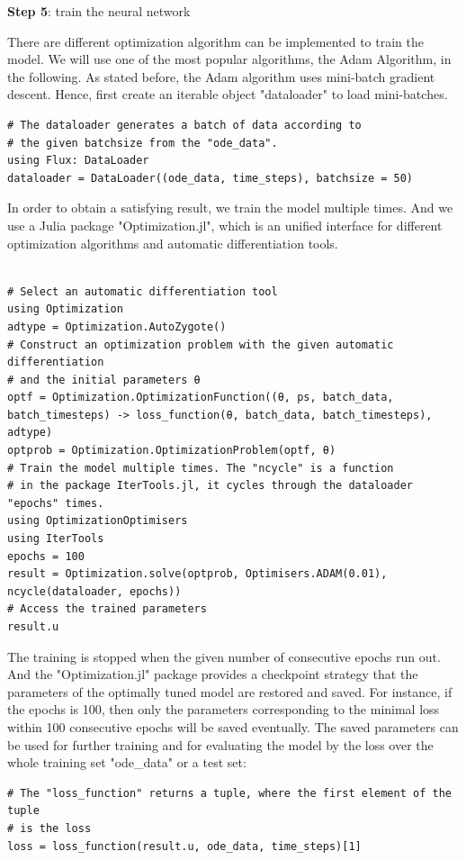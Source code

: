 \documentclass[
	parskip, 			   %
	twoside, 			   %
	DIV=14, 			   %
	BCOR=15.0mm, 		   %
	headsepline, 		   %
	open=right, 		   %
	captions=tableheading, %
	bibliography=totoc,    %
	numbers=noenddot       %
]{scrreprt}
\begin{document}
\textbf{Step 5}: train the neural network

There are different optimization algorithm can be implemented to train the model. We will use one of the most popular algorithms, the Adam Algorithm, in the following. As stated before, the Adam algorithm uses mini-batch gradient descent. Hence, first create an iterable object "dataloader" to load mini-batches.

\begin{verbatim}
# The dataloader generates a batch of data according to 
# the given batchsize from the "ode_data".
using Flux: DataLoader
dataloader = DataLoader((ode_data, time_steps), batchsize = 50)
\end{verbatim}

In order to obtain a satisfying result, we train the model multiple times. And we use a Julia package "Optimization.jl", which is an unified interface for different optimization algorithms and automatic differentiation tools.

\begin{verbatim}

# Select an automatic differentiation tool
using Optimization
adtype = Optimization.AutoZygote()
# Construct an optimization problem with the given automatic differentiation 
# and the initial parameters θ
optf = Optimization.OptimizationFunction((θ, ps, batch_data, batch_timesteps) -> loss_function(θ, batch_data, batch_timesteps), adtype)
optprob = Optimization.OptimizationProblem(optf, θ)
# Train the model multiple times. The "ncycle" is a function 
# in the package IterTools.jl, it cycles through the dataloader "epochs" times.
using OptimizationOptimisers
using IterTools
epochs = 100
result = Optimization.solve(optprob, Optimisers.ADAM(0.01), ncycle(dataloader, epochs))
# Access the trained parameters
result.u
\end{verbatim}

The training is stopped when the given number of consecutive epochs run out. And the "Optimization.jl" package provides a checkpoint strategy that the parameters of the optimally tuned model are restored and saved. For instance, if the epochs is 100, then only the parameters corresponding to the minimal loss within 100 consecutive epochs will be saved eventually.  The saved parameters can be used for further training and for evaluating the model by the loss over the whole training set "ode\_data" or a test set:
\begin{verbatim}
# The "loss_function" returns a tuple, where the first element of the tuple 
# is the loss
loss = loss_function(result.u, ode_data, time_steps)[1]
\end{verbatim}
\end{document}
